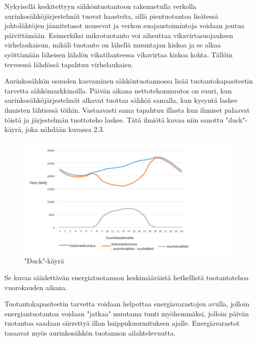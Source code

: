   Nykyisellä keskitettyyn sähköntuotantoon rakennetulla verkolla aurinkosähköjärjestelmät tuovat haasteita, sillä pientuotantoa lisätessä johtolähtöjen jännitetasot nousevat ja verkon suojaustoimintoja voidaan joutua päivittämään. Esimerkiksi mikrotuotanto voi aiheuttaa vikavirtasuojauksen virhelaukaisun, mikäli tuotanto on lähellä muuntajan kiskoa ja se alkaa syöttämään läheisen lähdön vikatilanteessa vikavirtaa kiskoa kohta. Tällöin terveessä lähdössä tapahtuu virhelaukaisu. \parencite{Mikrotuotanto}
  
  Aurinkosähkön osuuden kasvaminen sähköntuotannossa lisää tuotantokapasiteetin tarvetta sähkömarkkinoilla. Päivän aikana nettotehonmuutos on suuri, kun aurinkosähköjärjestelmät alkavat tuottaa sähköä samalla, kun kysyntä laskee ihmisten lähtiessä töihin. Vastaavasti sama tapahtuu illasta kun ihmiset palaavat töistä ja järjestelmän tuottoteho laskee. Tätä ilmiötä kuvaa niin sanottu "duck"-käyrä, joka nähdään kuvassa 2.3. \begin{figure}
    \centering
    \includegraphics[width=1.1\textwidth]{figures/Duck_curve.png}
    \caption{"Duck"-käyrä}
  \end{figure} Se kuvaa säädettävän energiatuotannon keskimääräistä hetkellistä tuotantotehoa vuorokauden aikana. \parencite{duckCurve}

  Tuotantokapasiteetin tarvetta voidaan helpottaa energiavarastojen avulla, jolloin energiantuotantoa voidaan "jatkaa" muutama tunti myöhemmäksi, jolloin päivän tuotantoa saadaan siirrettyä illan huippukuormituksen ajalle. Energiavarastot tasaavat myös aurinkosähkön tuotannon ailahtelevuutta. 
